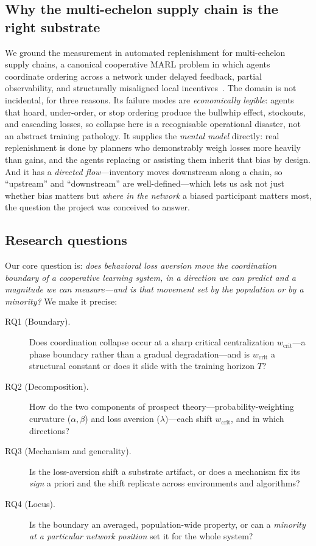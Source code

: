 \documentclass[letterpaper]{article}
\theoremstyle{plain}
\newcommand{\wcrit}{w_{\mathrm{crit}}}
\begin{document}
\subsection{Why the multi-echelon supply chain is the right substrate}
We ground the measurement in automated replenishment for multi-echelon supply
chains, a canonical cooperative MARL problem in which agents coordinate ordering
across a network under delayed feedback, partial observability, and structurally
misaligned local incentives~\citep{oroojlooyjadid2022,gijsbrechts2022}. The
domain is not incidental, for three reasons. Its failure modes are
\emph{economically legible}: agents that hoard, under-order, or stop ordering
produce the bullwhip effect, stockouts, and cascading losses, so collapse here is
a recognisable operational disaster, not an abstract training pathology. It
supplies the \emph{mental model} directly: real replenishment is done by planners
who demonstrably weigh losses more heavily than gains, and the agents replacing
or assisting them inherit that bias by design. And it has a \emph{directed
flow}---inventory moves downstream along a chain, so ``upstream'' and
``downstream'' are well-defined---which lets us ask not just whether bias matters
but \emph{where in the network} a biased participant matters most, the question
the project was conceived to answer.

\subsection{Research questions}
Our core question is: \emph{does behavioral loss aversion move the coordination
boundary of a cooperative learning system, in a direction we can predict and a
magnitude we can measure---and is that movement set by the population or by a
minority?} We make it precise:
\begin{description}
  \item[RQ1 (Boundary).] Does coordination collapse occur at a sharp critical
        centralization $\wcrit$---a phase boundary rather than a gradual
        degradation---and is $\wcrit$ a structural constant or does it slide with
        the training horizon $T$?
  \item[RQ2 (Decomposition).] How do the two components of prospect
        theory---probability-weighting curvature ($\alpha,\beta$) and loss
        aversion ($\lambda$)---each shift $\wcrit$, and in which directions?
  \item[RQ3 (Mechanism and generality).] Is the loss-aversion shift a substrate
        artifact, or does a mechanism fix its \emph{sign} a priori and the shift
        replicate across environments and algorithms?
  \item[RQ4 (Locus).] Is the boundary an averaged, population-wide property, or
        can a \emph{minority at a particular network position} set it for the
        whole system?
\end{description}
\end{document}
